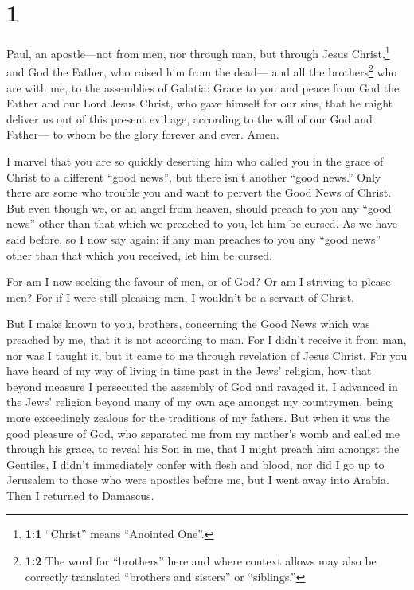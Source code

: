 \hypertarget{section}{%
\section{1}\label{section}}

 Paul, an apostle---not from men, nor through man, but
through Jesus Christ,\footnote{\textbf{1:1} ``Christ'' means ``Anointed
  One''.} and God the Father, who raised him from the dead---
 and all the brothers\footnote{\textbf{1:2} The word for
  ``brothers'' here and where context allows may also be correctly
  translated ``brothers and sisters'' or ``siblings.''} who are with me,
to the assemblies of Galatia:  Grace to you and peace from
God the Father and our Lord Jesus Christ,  who gave
himself for our sins, that he might deliver us out of this present evil
age, according to the will of our God and Father---  to
whom be the glory forever and ever. Amen.

 I marvel that you are so quickly deserting him who called
you in the grace of Christ to a different ``good news'', 
but there isn't another ``good news.'' Only there are some who trouble
you and want to pervert the Good News of Christ.  But even
though we, or an angel from heaven, should preach to you any ``good
news'' other than that which we preached to you, let him be cursed.
 As we have said before, so I now say again: if any man
preaches to you any ``good news'' other than that which you received,
let him be cursed.

 For am I now seeking the favour of men, or of God? Or am
I striving to please men? For if I were still pleasing men, I wouldn't
be a servant of Christ.

 But I make known to you, brothers, concerning the Good
News which was preached by me, that it is not according to man.
 For I didn't receive it from man, nor was I taught it,
but it came to me through revelation of Jesus Christ. 
For you have heard of my way of living in time past in the Jews'
religion, how that beyond measure I persecuted the assembly of God and
ravaged it.  I advanced in the Jews' religion beyond many
of my own age amongst my countrymen, being more exceedingly zealous for
the traditions of my fathers.  But when it was the good
pleasure of God, who separated me from my mother's womb and called me
through his grace,  to reveal his Son in me, that I might
preach him amongst the Gentiles, I didn't immediately confer with flesh
and blood,  nor did I go up to Jerusalem to those who
were apostles before me, but I went away into Arabia. Then I returned to
Damascus.


